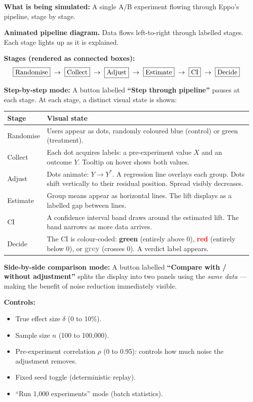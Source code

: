 \documentclass[12pt, a4paper]{article}
\begin{document}
\begin{simulation}
\textbf{What is being simulated:}
A single A/B experiment flowing through Eppo's pipeline, stage by stage.

\textbf{Animated pipeline diagram.}  Data flows left-to-right through
labelled stages.  Each stage lights up as it is explained.

\textbf{Stages (rendered as connected boxes):}
\[
  \fbox{Randomise}
  \;\to\;
  \fbox{Collect}
  \;\to\;
  \fbox{Adjust}
  \;\to\;
  \fbox{Estimate}
  \;\to\;
  \fbox{CI}
  \;\to\;
  \fbox{Decide}
\]

\textbf{Step-by-step mode:}
A button labelled \textbf{``Step through pipeline''} pauses at each stage.
At each stage, a distinct visual state is shown:

\begin{center}
\renewcommand{\arraystretch}{1.3}
\begin{tabular}{@{} l p{9cm} @{}}
\toprule
\textbf{Stage} & \textbf{Visual state} \\
\midrule
Randomise & Users appear as dots, randomly coloured blue (control) or
  green (treatment). \\
Collect & Each dot acquires labels: a pre-experiment value $X$ and an
  outcome $Y$.  Tooltip on hover shows both values. \\
Adjust & Dots animate: $Y \to Y^*$.  A regression line overlays each group.
  Dots shift vertically to their residual position.  Spread visibly
  decreases. \\
Estimate & Group means appear as horizontal lines.  The lift displays
  as a labelled gap between lines. \\
CI & A confidence interval band draws around the estimated lift.
  The band narrows as more data arrives. \\
Decide & The CI is colour-coded:
  \textcolor{green!60!black}{\textbf{green}} (entirely above 0),
  \textcolor{red}{\textbf{red}} (entirely below 0), or
  \textcolor{gray}{\textbf{grey}} (crosses 0).  A verdict label appears. \\
\bottomrule
\end{tabular}
\end{center}

\textbf{Side-by-side comparison mode:}
A button labelled \textbf{``Compare with / without adjustment''}
splits the display into two panels using the \emph{same data} ---
making the benefit of noise reduction immediately visible.

\textbf{Controls:}
\begin{itemize}[nosep]
  \item True effect size $\delta$ (0 to 10\%).
  \item Sample size $n$ (100 to 100,000).
  \item Pre-experiment correlation $\rho$ (0 to 0.95): controls how much
        noise the adjustment removes.
  \item Fixed seed toggle (deterministic replay).
  \item ``Run 1,000 experiments'' mode (batch statistics).
\end{itemize}


\end{simulation}
\end{document}

